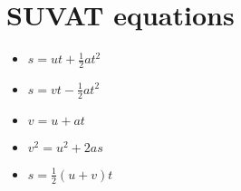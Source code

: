 \section{SUVAT equations}
\begin{itemize}
    \item $s=ut+\frac{1}{2}at^2$
    \item $s=vt-\frac{1}{2}at^2$
    \item $v=u+at$
    \item $v^2=u^2+2as$
    \item $s=\frac{1}{2}(u+v)t$
\end{itemize}
